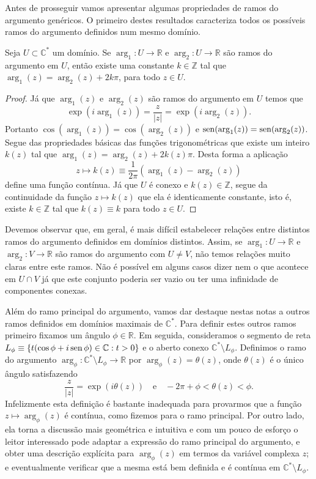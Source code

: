\bigskip 

Antes de prosseguir vamos apresentar algumas 
propriedades de ramos do argumento genéricos.
O primeiro destes resultados caracteriza todos os possíveis 
ramos do argumento definidos num mesmo domínio.

\begin{proposicao}\label{prop-arg1-arg2-2kpi}
Seja $U\subset\mathbb{C}^{*}$ um domínio. Se $\arg_1:U\to\mathbb{R}$ e 
$\arg_2:U\to\mathbb{R}$ são ramos do argumento em $U$, 
então existe uma constante $k\in\mathbb{Z}$
tal que $\arg_1(z)=\arg_2(z)+2k\pi$, para todo $z\in U$.
\end{proposicao}

\begin{proof}
Já que $\arg_1(z)$ e $\arg_2(z)$ são ramos do argumento em $U$ temos que
\[
\exp(i\arg_1(z))=\frac{z}{|z|}=\exp(i\arg_2(z)).
\]
Portanto $\cos(\arg_1(z))=\cos(\arg_2(z))$ e 
$\operatorname{sen}(\arg_1(z))=\operatorname{sen}(\arg_2(z))$. Segue das propriedades básicas das funções 
trigonométricas que existe um inteiro $k(z)$ tal que  
$\arg_1(z)=\arg_2(z)+2k(z)\pi$. Desta forma a aplicação
\[
z\longmapsto k(z)\equiv \frac{1}{2\pi}(\arg_1(z)-\arg_2(z)) 
\]
define uma função contínua. Já que $U$ é conexo e $k(z)\in\mathbb{Z}$,
segue da continuidade da função $z\longmapsto k(z)$ que ela é identicamente constante, isto é, existe 
$k\in\mathbb{Z}$ tal que $k(z)\equiv k$ para todo $z\in U$.
\end{proof}


\bigskip

Devemos observar que, em geral, é mais difícil estabelecer relações 
entre distintos ramos do argumento definidos em domínios distintos.
Assim, se $\arg_1:U\to\mathbb{R}$ e $\arg_2:V\to\mathbb{R}$ 
são ramos do argumento com $U\neq V$, não temos relações muito claras
entre este ramos. Não é possível em alguns casos dizer nem o que acontece 
em $U\cap V$ já que este conjunto poderia ser vazio ou ter uma infinidade
de componentes conexas. 


Além do ramo principal do argumento, vamos dar destaque nestas notas
a outros ramos definidos em domínios maximais de $\mathbb{C}^{*}$.
Para definir estes outros ramos primeiro fixamos um ângulo $\phi\in \mathbb{R}$.
Em seguida, consideramos o segmento de reta 
$L_{\phi}\equiv \{t(\cos\phi+i\operatorname{sen} \phi)\in \mathbb{C}: t>0\}$ e o 
aberto conexo $\mathbb{C}^{*}\setminus L_{\phi}$.
Definimos o ramo do argumento $\arg_{\phi}:\mathbb{C}^{*}\setminus L_{\phi}\to\mathbb{R}$
por $\arg_{\phi}(z)= \theta(z)$, onde $\theta(z)$ é o único ângulo satisfazendo 
\[
\frac{z}{|z|}=\exp(i\theta(z))\quad\text{e}\quad -2\pi+\phi<\theta(z)<\phi.
\]  
Infelizmente esta definição é bastante inadequada para provarmos que a função 
$z\longmapsto \arg_{\phi}(z)$ é contínua, como fizemos para o ramo principal.
Por outro lado, ela torna a discussão mais geométrica e intuitiva e com um pouco 
de esforço o leitor interessado pode adaptar a expressão do ramo principal do 
argumento, e obter uma descrição explícita para $\arg_{\phi}(z)$ em 
termos da variável complexa $z$; e eventualmente verificar que a mesma está bem
definida e é contínua em $\mathbb{C}^{*}\setminus L_{\phi}$. 


